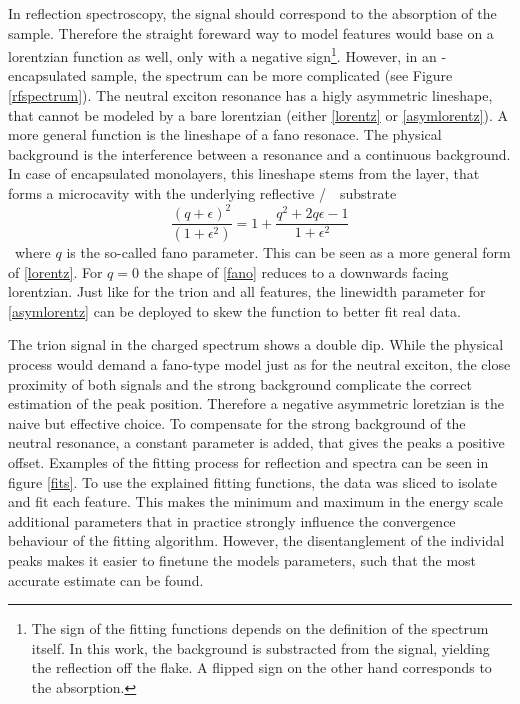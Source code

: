 In reflection spectroscopy, the signal should correspond to the absorption of the sample. Therefore the straight foreward way to model features would base on a lorentzian function as well, only with a negative sign\footnote{The sign of the fitting functions depends on the definition of the spectrum itself. In this work, the background is substracted from the signal, yielding the reflection off the flake. A flipped sign on the other hand corresponds to the absorption.}. However, in an \hbn-encapsulated sample, the spectrum can be more complicated (see Figure \ref{rfspectrum}). The neutral exciton resonance has a higly asymmetric lineshape, that cannot be modeled by a bare lorentzian (either \eqref{lorentz} or \eqref{asymlorentz}). A more general function is the lineshape of a fano resonace. The physical background is the interference between a resonance and a continuous background\cite{fano_effects_1961}. In case of encapsulated \tmdg monolayers, this lineshape stems from the \hbng layer, that forms a microcavity with the underlying reflective \si/\sio substrate\cite{scuri_large_2018}.
\begin{equation}
\frac{(q+\epsilon)^2}{(1+\epsilon^2)} = 1 + \frac{q^2+2q\epsilon-1}{1+\epsilon^2}\label{fano}
\end{equation}
where $q$ is the so-called fano parameter. This can be seen as a more general form of \eqref{lorentz}. For $q=0$ the shape of \eqref{fano} reduces to a downwards facing lorentzian. Just like for the trion and all \pl features, the linewidth parameter for \eqref{asymlorentz} can be deployed to skew the function to better fit real data.

The trion signal in the charged spectrum shows a double dip. While the physical process would demand a fano-type model just as for the neutral exciton, the close proximity of both signals and the strong background complicate the correct estimation of the peak position. Therefore a negative asymmetric loretzian is the naive but effective choice. To compensate for the strong background of the neutral resonance, a constant parameter is added, that gives the peaks a positive offset. 
Examples of the fitting process for reflection and \pl spectra can be seen in figure \ref{fits}. To use the explained fitting functions, the data was sliced to isolate and fit each feature. This makes the minimum and maximum in the energy scale additional parameters that in practice strongly influence the convergence behaviour of the fitting algorithm. However, the disentanglement of the individal peaks makes it easier to finetune the models parameters, such that the most accurate estimate can be found.

